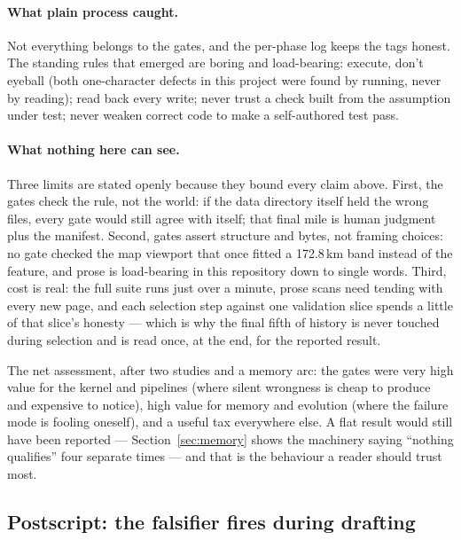 \documentclass[11pt]{article}
\begin{document}
\paragraph{What plain process caught.} Not everything belongs to the gates,
and the per-phase log keeps the tags honest. The standing rules that emerged
are boring and load-bearing: execute, don't eyeball (both one-character
defects in this project were found by running, never by reading); read back
every write; never trust a check built from the assumption under test; never
weaken correct code to make a self-authored test pass.

\paragraph{What nothing here can see.} Three limits are stated openly because
they bound every claim above. First, the gates check the rule, not the
world: if the data directory itself held the wrong files, every gate would
still agree with itself; that final mile is human judgment plus the manifest.
Second, gates assert structure and bytes, not framing choices: no gate
checked the map viewport that once fitted a 172.8\,km band instead of the
feature, and prose is load-bearing in this repository down to single words.
Third, cost is real: the full suite runs just over a minute, prose scans need
tending with every new page, and each selection step against one validation
slice spends a little of that slice's honesty --- which is why the final
fifth of history is never touched during selection and is read once, at the
end, for the reported result.

The net assessment, after two studies and a memory arc: the gates were very
high value for the kernel and pipelines (where silent wrongness is cheap to
produce and expensive to notice), high value for memory and evolution (where
the failure mode is fooling oneself), and a useful tax everywhere else. A
flat result would still have been reported --- Section~\ref{sec:memory} shows
the machinery saying ``nothing qualifies'' four separate times --- and that
is the behaviour a reader should trust most.

\subsection{Postscript: the falsifier fires during drafting}
\label{sec:postscript}
\end{document}
